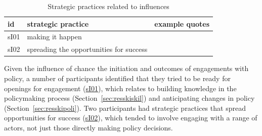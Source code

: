 \begin{table}[!ht]
\footnotesize
\caption{Strategic practices related to \skiagen{} influences}\label{tab:resskiagenstrat}
\begin{tabular}{L{.06\linewidth}L{.3\linewidth}L{.64\linewidth}} \hline
\textbf{id} & \textbf{strategic practice} & \textbf{example quotes} \\ \hline \hline
sI01 & making it happen &  \\
sI02 & spreading the opportunities for success &  \\
\hline
 \end{tabular}
\end{table}

Given the influence of chance the initiation and outcomes of engagements with policy, a number of participants identified that they tried to be ready for openings for engagement (\hyperref[tab:resskiagenstrat]{sI01}), which relates to building knowledge in the policymaking process (Section~\ref{sec:resskiskil}) and anticipating changes in policy (Section~\ref{sec:resskipoli}). Two participants had strategic practices that spread opportunities for success (\hyperref[tab:resskiagenstrat]{sI02}), which tended to involve engaging with a range of actors, not just those directly making policy decisions.

\subsection{\titpers}\label{sec:resskipers}

